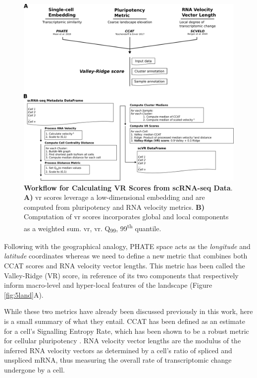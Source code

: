 \begin{figure}[H]
    \centering
    \includegraphics{05vr/figs/5VR_score.png}
    \caption{\textbf{Workflow for Calculating VR Scores from scRNA-seq Data}. \textbf{A)} \acrshort{vr} scores leverage a low-dimensional embedding and are computed from pluripotency and RNA velocity metrics. \textbf{B)} Computation of \acrshort{vr} scores incorporates  global and local components as a weighted sum. \acrshort{vr}, \acrlong{vr}. Q\textsubscript{99}, 99\textsuperscript{th} quantile.}
    \label{fig:5score}
\end{figure}

Following with the geographical analogy, PHATE space acts as the \emph{longitude} and \emph{latitude} coordinates whereas we need to define a new metric that combines both CCAT scores and RNA velocity vector lengths. This metric has been called the Valley-Ridge (VR) score, in reference of its two components that respectively inform macro-level and hyper-local features of the landscape (Figure \ref{fig:5land}A).

While these two metrics have already been discussed previously in this work, here is a small summary of what they entail. CCAT has been defined as an estimate for a cell's Signalling Entropy Rate, which has been shown to be a robust metric for cellular pluripotency \cite{teschendorff_single-cell_2017,chen_single-cell_2019,senra_origins_2022}. RNA velocity vector lengths are the modulus of the inferred RNA velocity vectors as determined by a cell's ratio of spliced and unspliced mRNA, thus measuring the overall rate of transcriptomic change undergone by a cell.

